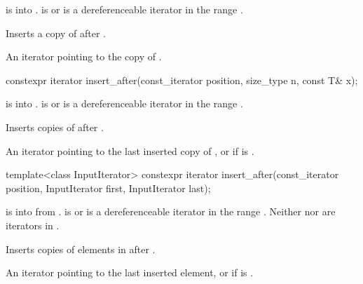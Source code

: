 \begin{itemdescr}
\pnum
\expects
{} is  into .
 is  or is a dereferenceable
iterator in the range .

\pnum
\effects
Inserts a copy of  after .

\pnum
\returns
An iterator pointing to the copy of .
\end{itemdescr}

%
\begin{itemdecl}
constexpr iterator insert_after(const_iterator position, size_type n, const T& x);
\end{itemdecl}

\begin{itemdescr}
\pnum
\expects
{} is  into .
 is  or is a dereferenceable
iterator in the range .

\pnum
\effects
Inserts  copies of  after .

\pnum
\returns
An iterator pointing to the last inserted copy of , or
 if  is .
\end{itemdescr}

%
\begin{itemdecl}
template<class InputIterator>
  constexpr iterator insert_after(const_iterator position,
                                  InputIterator first, InputIterator last);
\end{itemdecl}

\begin{itemdescr}
\pnum
\expects
{} is  into 
from .
 is  or is a dereferenceable
iterator in the range .
Neither  nor  are iterators in .

\pnum
\effects
Inserts copies of elements in  after .

\pnum
\returns
An iterator pointing to the last inserted element, or
 if  is .
\end{itemdescr}

